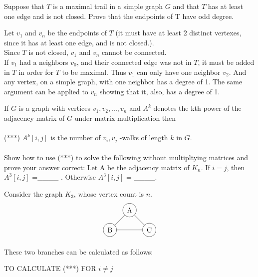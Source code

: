 \documentclass[12pt]{article}
\newenvironment{question}[2][Question]{\begin{trivlist}
\item[\hskip \labelsep {\bfseries #1}\hskip \labelsep {\bfseries #2.}]}{\end{trivlist}}
\begin{document}
\begin{question}{4}
Suppose that $T$ is a maximal trail in a simple graph $G$ and that $T$ has at least one edge and is not closed. Prove that the endpoints of T have odd degree.
\end{question}

Let $v_1$ and $v_n$ be the endpoints of $T$ (it must have at least 2 distinct vertexes, since it has at least one edge, and is not closed.). \\

Since $T$ is not closed, $v_1$ and $v_n$ cannot be connected. \\

If $v_1$ had a neighbors $v_0$, and their connected edge was not in $T$, it must be added in $T$ in order for $T$ to be maximal. Thus $v_1$ can only have one neighbor $v_2$. And any vertex, on a simple graph, with one neighbor has a degree of 1. The same argument can be applied to $v_n$ showing that it, also, has a degree of 1.

\begin{question}{5}
If $G$ is a graph with vertices $v_1, v_2, . . . , v_n$ and $A^k$ denotes the kth power of the adjacency matrix
of $G$ under matrix multiplication then \\ \\

(***) $A^{k}[i, j]$ is the number of $v_i, v_j$ -walks of length $k$ in $G$. \\ \\

Show how to use (***) to solve the following without multipltying matrices and prove your answer
correct: Let A be the adjacency matrix of $K_n$. If $i = j$, then $A^3[i, j]$ =\_\_\_\_ . Otherwise
$A^{3}[i, j]$ = \_\_\_\_.
\end{question}

Consider the graph $K_3$, whose vertex count is $n$.
\begin{align*}
\begin{tikzpicture}
\node[shape=circle,draw=black] (A) at (1,1) {A};
\node[shape=circle,draw=black] (B) at (0,0) {B};
\node[shape=circle,draw=black] (C) at (2,0) {C};
\path [] (A) edge node[left] {} (B);
\path [] (A) edge node[left] {} (C);
\path [] (B) edge node[left] {} (C);
\end{tikzpicture}
\end{align*}

These two branches can be calculated as follows: 
\begin{center}
\Large TO CALCULATE (***) FOR $i \neq j$
\end{center}
\normalsize
\end{document}
